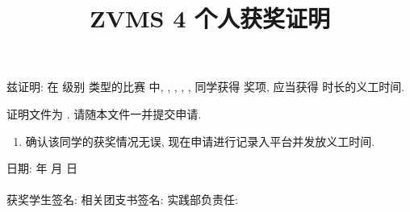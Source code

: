\documentclass{article}
\title{ZVMS 4 个人获奖证明}
\date{}
\begin{document}
兹证明: 在 \underline{\hspace{3em}} 级别 \underline{\hspace{3em}} 类型的比赛 \underline{\hspace{8em}} 中, \underline{\hspace{3em}}, \underline{\hspace{3em}}, \underline{\hspace{3em}}, \underline{\hspace{3em}}, \underline{\hspace{3em}} 同学获得 \underline{\hspace{3em}} 奖项, 应当获得 \underline{\hspace{3em}} 时长的义工时间.

证明文件为 \underline{\hspace{5em}}. 请随本文件一并提交申请.

\begin{enumerate}[label=$\square$]
  \item 确认该同学的获奖情况无误, 现在申请进行记录入平台并发放义工时间.
\end{enumerate}

\begin{flushright}
  日期: \underline{\hspace{4em}} 年 \underline{\hspace{2em}} 月 \underline{\hspace{2em}} 日
  ~\\~\\
  获奖学生签名: \underline{\hspace{6em}} \hspace{1em}
  相关团支书签名: \underline{\hspace{6em}} \hspace{1em}
  实践部负责任: \underline{\hspace{6em}}
\end{flushright}
\end{document}
